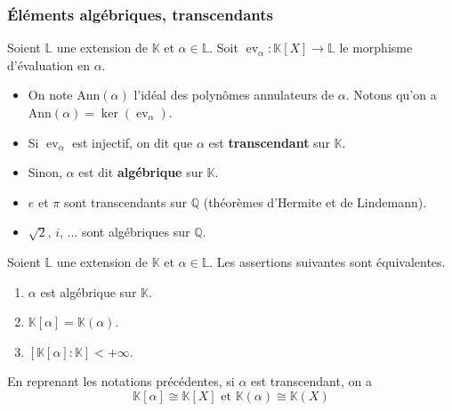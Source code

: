   \subsubsection{Éléments algébriques, transcendants}


  \begin{definition}
    Soient $\mathbb{L}$ une extension de $\mathbb{K}$ et $\alpha \in \mathbb{L}$. Soit $\operatorname{ev}_\alpha : \mathbb{K}[X] \rightarrow \mathbb{L}$ le morphisme d'évaluation en $\alpha$.
    \begin{itemize}
      \item On note $\mathrm{Ann}(\alpha)$ l'idéal des polynômes annulateurs de $\alpha$. Notons qu'on a $\mathrm{Ann}(\alpha) = \ker(\operatorname{ev}_\alpha)$.
      \item Si $\operatorname{ev}_\alpha$ est injectif, on dit que $\alpha$ est \textbf{transcendant} sur $\mathbb{K}$.
      \item Sinon, $\alpha$ est dit \textbf{algébrique} sur $\mathbb{K}$.
    \end{itemize}
  \end{definition}

  \begin{example}
    \begin{itemize}
      \item $e$ et $\pi$ sont transcendants sur $\mathbb{Q}$ (théorèmes d'Hermite et de Lindemann).
      \item $\sqrt{2}$, $i$, ... sont algébriques sur $\mathbb{Q}$.
    \end{itemize}
  \end{example}

  \begin{proposition}
    Soient $\mathbb{L}$ une extension de $\mathbb{K}$ et $\alpha \in \mathbb{L}$. Les assertions suivantes sont équivalentes.
    \begin{enumerate}[label=(\roman*)]
      \item $\alpha$ est algébrique sur $\mathbb{K}$.
      \item $\mathbb{K}[\alpha] = \mathbb{K}(\alpha)$.
      \item $[\mathbb{K}[\alpha]:\mathbb{K}] < +\infty$.
    \end{enumerate}
  \end{proposition}

  \begin{proposition}
    En reprenant les notations précédentes, si $\alpha$ est transcendant, on a
    \[ \mathbb{K}[\alpha] \cong \mathbb{K}[X] \text{ et } \mathbb{K}(\alpha) \cong \mathbb{K}(X) \]
  \end{proposition}

